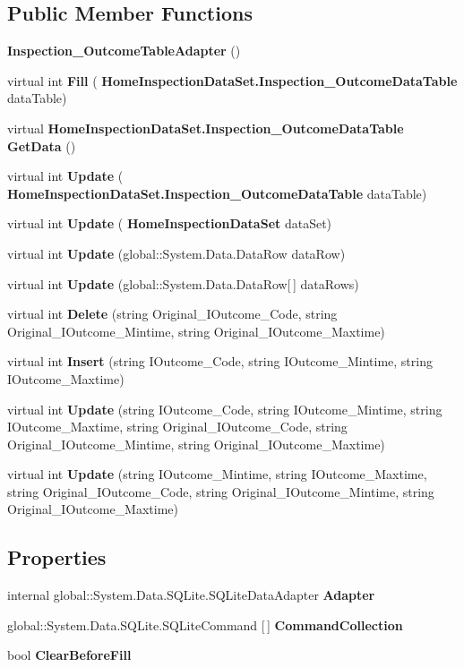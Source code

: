 \subsection*{Public Member Functions}
\begin{DoxyCompactItemize}
\item 
\textbf{ Inspection\+\_\+\+Outcome\+Table\+Adapter} ()
\item 
virtual int \textbf{ Fill} (\textbf{ Home\+Inspection\+Data\+Set.\+Inspection\+\_\+\+Outcome\+Data\+Table} data\+Table)
\item 
virtual \textbf{ Home\+Inspection\+Data\+Set.\+Inspection\+\_\+\+Outcome\+Data\+Table} \textbf{ Get\+Data} ()
\item 
virtual int \textbf{ Update} (\textbf{ Home\+Inspection\+Data\+Set.\+Inspection\+\_\+\+Outcome\+Data\+Table} data\+Table)
\item 
virtual int \textbf{ Update} (\textbf{ Home\+Inspection\+Data\+Set} data\+Set)
\item 
virtual int \textbf{ Update} (global\+::\+System.\+Data.\+Data\+Row data\+Row)
\item 
virtual int \textbf{ Update} (global\+::\+System.\+Data.\+Data\+Row[$\,$] data\+Rows)
\item 
virtual int \textbf{ Delete} (string Original\+\_\+\+I\+Outcome\+\_\+\+Code, string Original\+\_\+\+I\+Outcome\+\_\+\+Mintime, string Original\+\_\+\+I\+Outcome\+\_\+\+Maxtime)
\item 
virtual int \textbf{ Insert} (string I\+Outcome\+\_\+\+Code, string I\+Outcome\+\_\+\+Mintime, string I\+Outcome\+\_\+\+Maxtime)
\item 
virtual int \textbf{ Update} (string I\+Outcome\+\_\+\+Code, string I\+Outcome\+\_\+\+Mintime, string I\+Outcome\+\_\+\+Maxtime, string Original\+\_\+\+I\+Outcome\+\_\+\+Code, string Original\+\_\+\+I\+Outcome\+\_\+\+Mintime, string Original\+\_\+\+I\+Outcome\+\_\+\+Maxtime)
\item 
virtual int \textbf{ Update} (string I\+Outcome\+\_\+\+Mintime, string I\+Outcome\+\_\+\+Maxtime, string Original\+\_\+\+I\+Outcome\+\_\+\+Code, string Original\+\_\+\+I\+Outcome\+\_\+\+Mintime, string Original\+\_\+\+I\+Outcome\+\_\+\+Maxtime)
\end{DoxyCompactItemize}
\subsection*{Properties}
\begin{DoxyCompactItemize}
\item 
internal global\+::\+System.\+Data.\+S\+Q\+Lite.\+S\+Q\+Lite\+Data\+Adapter \textbf{ Adapter}\hspace{0.3cm}{\ttfamily  [get]}
\item 
global\+::\+System.\+Data.\+S\+Q\+Lite.\+S\+Q\+Lite\+Command [$\,$] \textbf{ Command\+Collection}\hspace{0.3cm}{\ttfamily  [get]}
\item 
bool \textbf{ Clear\+Before\+Fill}\hspace{0.3cm}{\ttfamily  [get, set]}
\end{DoxyCompactItemize}


